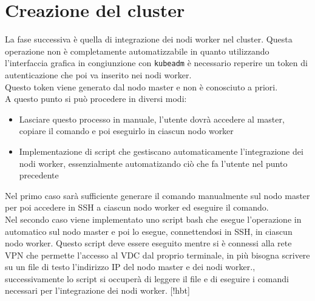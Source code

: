 \documentclass[12pt,a4paper,openright,twoside]{book}
\begin{document}
\section{Creazione del cluster}
La fase successiva è quella di integrazione dei nodi worker nel cluster. Questa operazione non è completamente automatizzabile in quanto utilizzando
l'interfaccia grafica in congiunzione con \texttt{kubeadm} è necessario reperire un token di autenticazione che poi va inserito nei nodi worker.\\
Questo token viene generato dal nodo master e non è conosciuto a priori.\\
A questo punto si può procedere in diversi modi:
\begin{itemize}
    \item Lasciare questo processo in manuale, l'utente dovrà accedere al master, copiare il comando e poi eseguirlo in ciascun nodo worker
    \item Implementazione di script che gestiscano automaticamente l'integrazione dei nodi worker, essenzialmente automatizando ciò che fa l'utente nel punto precedente
\end{itemize}
Nel primo caso sarà sufficiente generare il comando manualmente sul nodo master per poi accedere in SSH a ciascun nodo worker ed eseguire il comando.\\
Nel secondo caso viene implementato uno script bash che esegue l'operazione in automatico sul nodo master e poi lo esegue, connettendosi in SSH, in ciascun nodo worker. 
Questo script deve essere eseguito mentre si è connessi alla rete VPN che permette l'accesso al VDC dal proprio terminale, in più bisogna scrivere su un file di testo l'indirizzo IP del nodo master e dei nodi worker.,
successivamente lo script si occuperà di leggere il file e di eseguire i comandi necessari per l'integrazione dei nodi worker.
[!hbt]
\end{document}
